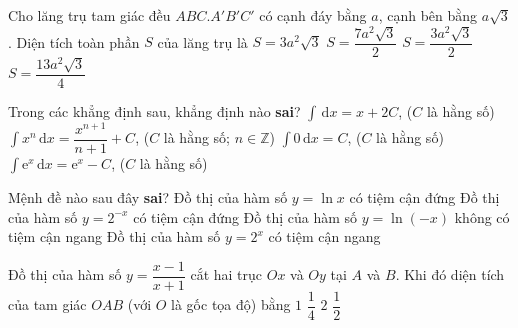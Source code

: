 \begin{ex}%
	Cho lăng trụ tam giác đều $ ABC.A'B'C' $ có cạnh đáy bằng $ a $, cạnh bên bằng $ a \sqrt{3} $. Diện tích toàn phần $ S $ của lăng trụ là
	\choice
	{$ S = 3 a^2 \sqrt{3} $}
	{\True $ S = \dfrac{7a^2 \sqrt{3}}{2} $}
	{$ S = \dfrac{3a^2 \sqrt{3}}{2} $}
	{$ S = \dfrac{13 a^2 \sqrt{3}}{4} $}
\end{ex}
\begin{ex}%
	Trong các khẳng định sau, khẳng định nào {\bf{sai}}?
	\choice
	{$ \displaystyle \int \mathrm{\, d}x = x + 2 C $, ($ C $ là hằng số) }
	{\True $ \displaystyle \int x^n \mathrm{\, d}x = \dfrac{x^{n+1}}{n+1} + C $, ($ C $ là hằng số; $ n \in \mathbb{Z} $) }
	{$ \displaystyle \int 0 \mathrm{\, d}x =  C $, ($ C $ là hằng số) }
	{$ \displaystyle \int \mathrm{e}^x \mathrm{\, d}x = \mathrm{e}^x - C $, ($ C $ là hằng số) }
\end{ex}
\begin{ex}%
	Mệnh đề nào sau đây {\bf sai}?
	\choice
	{Đồ thị của hàm số $ y = \ln x $ có tiệm cận đứng}
	{\True Đồ thị của hàm số $ y = 2^{-x} $ có tiệm cận đứng}
	{Đồ thị của hàm số $ y = \ln (-x) $ không có tiệm cận ngang}
	{Đồ thị của hàm số $ y = 2^x $ có tiệm cận ngang}
\end{ex}
\begin{ex}%
	Đồ thị của hàm số $ y = \dfrac{x - 1}{x+1} $ cắt hai trục $ Ox $ và $ Oy $ tại $ A $ và $ B $. Khi đó diện tích của tam giác $ OAB $ (với $ O $ là gốc tọa độ) bằng
	\choice
	{$ 1 $}
	{$ \dfrac{1}{4} $}
	{$ 2 $}
	{\True $ \dfrac{1}{2} $}
\end{ex}
